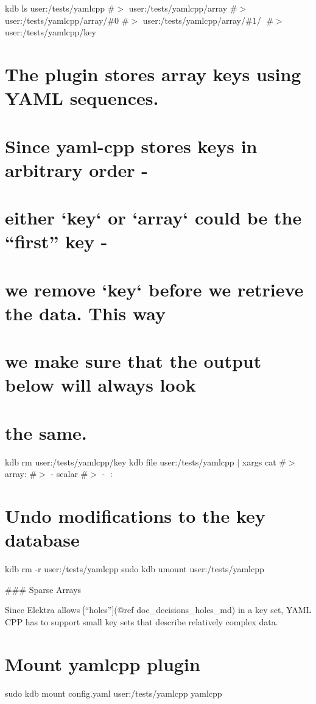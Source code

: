 kdb ls user\+:/tests/yamlcpp \#$>$ user\+:/tests/yamlcpp/array \#$>$ user\+:/tests/yamlcpp/array/\#0 \#$>$ user\+:/tests/yamlcpp/array/\#1/🔑 \#$>$ user\+:/tests/yamlcpp/key\hypertarget{autotoc_md817_autotoc_md852}{}\section{The plugin stores array keys using Y\+A\+M\+L sequences.}\label{autotoc_md817_autotoc_md852}
\hypertarget{autotoc_md817_autotoc_md853}{}\section{Since yaml-\/cpp stores keys in arbitrary order -\/}\label{autotoc_md817_autotoc_md853}
\hypertarget{autotoc_md817_autotoc_md854}{}\section{either `key` or `array` could be the “first” key -\/}\label{autotoc_md817_autotoc_md854}
\hypertarget{autotoc_md817_autotoc_md855}{}\section{we remove `key` before we retrieve the data. This way}\label{autotoc_md817_autotoc_md855}
\hypertarget{autotoc_md817_autotoc_md856}{}\section{we make sure that the output below will always look}\label{autotoc_md817_autotoc_md856}
\hypertarget{autotoc_md817_autotoc_md857}{}\section{the same.}\label{autotoc_md817_autotoc_md857}
kdb rm user\+:/tests/yamlcpp/key kdb file user\+:/tests/yamlcpp $\vert$ xargs cat \#$>$ array\+: \#$>$ -\/ scalar \#$>$ -\/ 🔑\+: 🙈\hypertarget{autotoc_md817_autotoc_md858}{}\section{Undo modifications to the key database}\label{autotoc_md817_autotoc_md858}
kdb rm -\/r user\+:/tests/yamlcpp sudo kdb umount user\+:/tests/yamlcpp 
\begin{DoxyCode}
### Sparse Arrays

Since Elektra allows [“holes”](@ref doc\_decisions\_holes\_md) in a key set, YAML CPP has to support small key
       sets that describe relatively complex data.
\end{DoxyCode}
 \hypertarget{autotoc_md817_autotoc_md859}{}\section{Mount yamlcpp plugin}\label{autotoc_md817_autotoc_md859}
sudo kdb mount config.\+yaml user\+:/tests/yamlcpp yamlcpp

